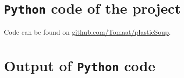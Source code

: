 \vfill



\clearpage

\begin{appendix}
\renewcommand{\thesubsection}{\thesection.\roman{subsection}}
\renewcommand{\thesubsubsection}{\thesubsection - \arabic{subsubsection}}

\section{\texttt{Python} code of the project}
\label{sec:ap-code}
Code can be found on \url{github.com/Tomaat/plasticSoup}.

%
%


\section{Output of \texttt{Python} code}
\label{sec:ap-out}

\end{appendix}
